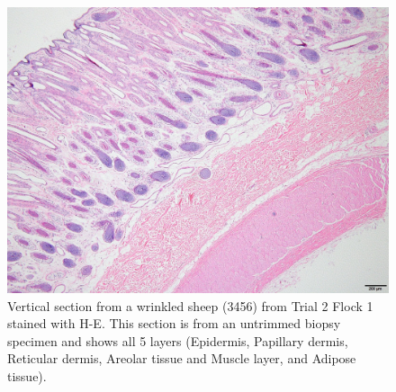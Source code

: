 %

\begin{figure}[!h]
  \centering
  \includegraphics[width=1.0\textwidth]{3456_4layers_4x.jpg}
  \caption{Vertical section from a wrinkled sheep (3456) from Trial 2 Flock 1 stained with H-E. This section is from an untrimmed biopsy specimen and shows all 5 layers (Epidermis, Papillary dermis, Reticular dermis, Areolar tissue and Muscle layer, and Adipose tissue).}
  \label{fig:trial2he}
\end{figure}

%

